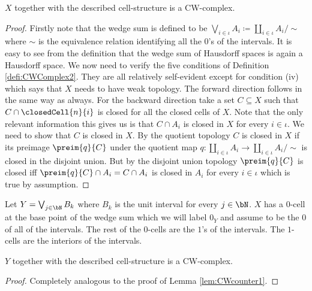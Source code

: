 \begin{lem} \label{lem:CWcounter1}
    $X$ together with the described cell-structure is a CW-complex.
\end{lem}
\begin{proof}
    Firstly note that the wedge sum is defined to be $\bigvee_{i \in \iota} A_i \coloneq \coprod_{i \in \iota} A_i / \sim$ where $\sim$ is the equivalence relation identifying all the $0$'s of the intervals. 
    It is easy to see from the definition that the wedge sum of Hausdorff spaces is again a Hausdorff space. 
    We now need to verify the five conditions of Definition \ref{defi:CWComplex2}. 
    They are all relatively self-evident except for condition (iv) which says that $X$ needs to have weak topology. 
    The forward direction follows in the same way as always. 
    For the backward direction take a set $C \subseteq X$ such that $C \cap \closedCell{n}{i}$ is closed for all the closed cells of $X$. 
    Note that the only relevant information this gives us is that $C \cap A_i$ is closed in $X$ for every $i \in \iota$.
    We need to show that $C$ is closed in $X$. 
    By the quotient topology $C$ is closed in $X$ if its preimage $\preim{q}{C}$ under the quotient map $q \colon \coprod_{i \in \iota} A_i \to \coprod_{i \in \iota} A_i / \sim$ is closed in the disjoint union. 
    But by the disjoint union topology $\preim{q}{C}$ is closed iff $\preim{q}{C} \cap A_i = C \cap A_i$ is closed in $A_i$ for every $i \in \iota$ which is true by assumption. 
\end{proof}

\begin{defi}
    Let $Y = \bigvee_{j \in \bN}B_k$ where $B_k$ is the unit interval for every $j \in \bN$.
    $X$ has a $0$-cell at the base point of the wedge sum which we will label $0_Y$ and assume to be the $0$ of all of the intervals. The rest of the $0$-cells are the $1$'s of the intervals. 
    The $1$-cells are the interiors of the intervals. 
\end{defi}

\begin{lem}
    $Y$ together with the described cell-structure is a CW-complex.
\end{lem}
\begin{proof}
    Completely analogous to the proof of Lemma \ref{lem:CWcounter1}.
\end{proof}

